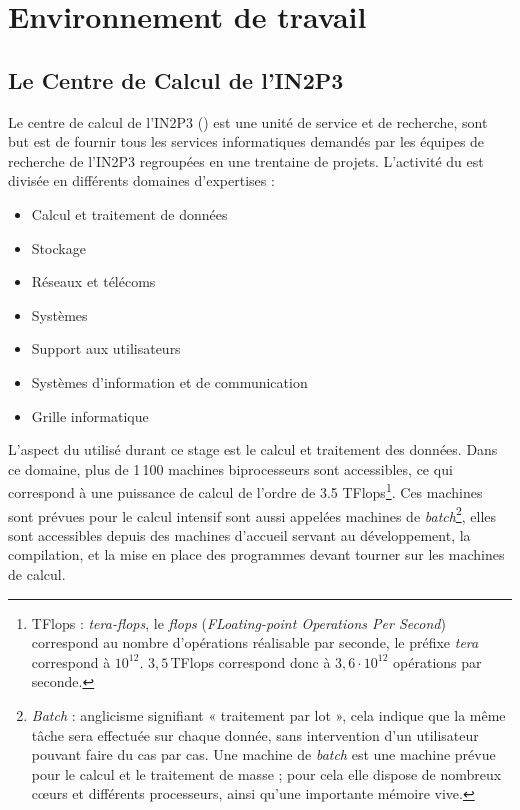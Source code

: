 
\section{Environnement de travail}

	\subsection{Le Centre de Calcul de l'IN2P3}

Le centre de calcul de l'IN2P3 (\CC) est une unité de service et de recherche, sont but est de fournir tous les services informatiques demandés par les équipes de recherche de l'IN2P3 regroupées en une trentaine de projets. L'activité du \CC{} est divisée en différents domaines d'expertises :
	\begin{itemize}
		\item Calcul et traitement de données
		\item Stockage
		\item Réseaux et télécoms
		\item Systèmes
		\item Support aux utilisateurs
		\item Systèmes d’information et de communication
		\item Grille informatique
	\end{itemize}
L'aspect du \CC{} utilisé durant ce stage est le calcul et traitement des données. Dans ce domaine, plus de 1\,100 machines biprocesseurs sont accessibles, ce qui correspond à une puissance de calcul de l'ordre de 3.5 TFlops\footnote{TFlops : \emph{tera-flops}, le \emph{flops} (\emph{FLoating-point Operations Per Second}) correspond au nombre d'opérations réalisable par seconde, le préfixe \emph{tera} correspond à $10^{12}$. $3,5$\,TFlops correspond donc à $3,6\cdot 10^{12}$ opérations par seconde.}. Ces machines sont prévues pour le calcul intensif sont aussi appelées machines de \emph{batch}\footnote{\emph{Batch} : anglicisme signifiant « traitement par lot », cela indique que la même tâche sera effectuée sur chaque donnée, sans intervention d'un utilisateur pouvant faire du cas par cas. Une machine de \emph{batch} est une machine prévue pour le calcul et le traitement de masse ; pour cela elle dispose de nombreux cœurs et différents processeurs, ainsi qu'une importante mémoire vive.}, elles sont accessibles depuis des machines d'accueil servant au développement, la compilation, et la mise en place des programmes devant tourner sur les machines de calcul.

